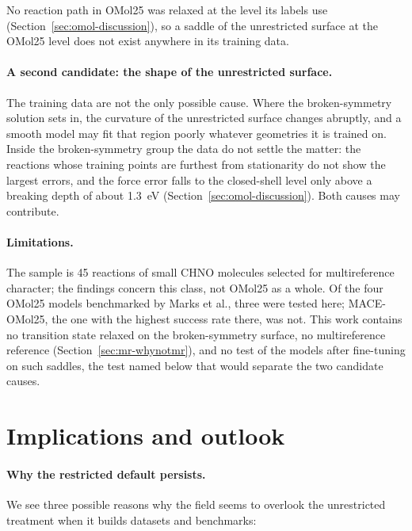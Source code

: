 No reaction path in OMol25 was relaxed at the level its labels use
(Section~\ref{sec:omol-discussion}), so a saddle of the unrestricted
surface at the OMol25 level does not exist anywhere in its training
data.

\paragraph{A second candidate: the shape of the unrestricted surface.}
The training data are not the only possible cause. Where the
broken-symmetry solution sets in, the curvature of the unrestricted
surface changes abruptly, and a smooth model may fit that region poorly
whatever geometries it is trained on. Inside the broken-symmetry group
the data do not settle the matter: the reactions whose training points
are furthest from stationarity do not show the largest errors, and the
force error falls to the closed-shell level only above a breaking depth
of about 1.3~eV (Section~\ref{sec:omol-discussion}). Both causes may
contribute.

\paragraph{Limitations.} The sample is 45 reactions of small CHNO
molecules selected for multireference character; the findings concern
this class, not OMol25 as a whole. Of the four OMol25 models
benchmarked by Marks et al., three were tested here; MACE-OMol25, the
one with the highest success rate there, was not. This work contains no transition
state relaxed on the broken-symmetry surface, no multireference
reference (Section~\ref{sec:mr-whynotmr}), and no test of the models
after fine-tuning on such saddles, the test named below that would
separate the two candidate causes.

\section{Implications and outlook}

\paragraph{Why the restricted default persists.} We see three possible reasons why
the field seems to overlook the unrestricted treatment when it builds
datasets and benchmarks:

